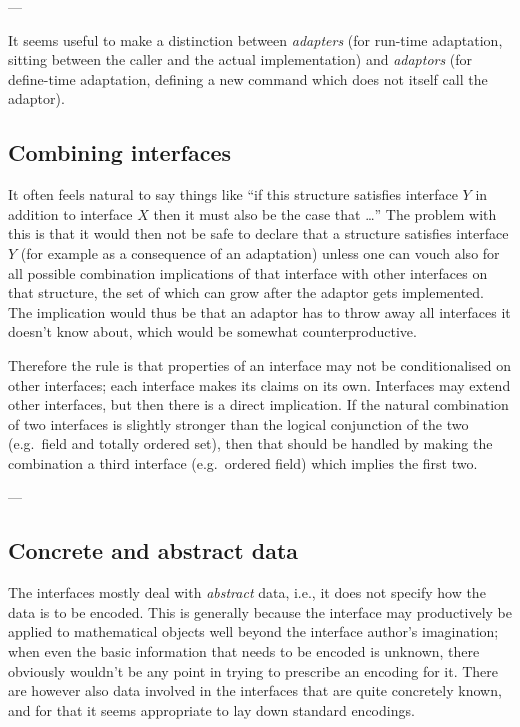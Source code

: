 \documentclass{mtmtcl}
\theoremstyle{plain}
\theoremstyle{remark}
\begin{document}
---

It seems useful to make a distinction between \emph{adapters} (for 
run-time adaptation, sitting between the caller and the actual 
implementation) and \emph{adaptors} (for define-time adaptation, 
defining a new command which does not itself call the adaptor).


\subsection{Combining interfaces}

It often feels natural to say things like ``if this structure 
satisfies interface $Y$ in addition to interface $X$ then it must 
also be the case that \dots'' The problem with this is that it would 
then not be safe to declare that a structure satisfies interface $Y$ 
(for example as a consequence of an adaptation) unless one can vouch 
also for all possible combination implications of that interface 
with other interfaces on that structure, the set of which can grow 
after the adaptor gets implemented. The implication would thus be 
that an adaptor has to throw away all interfaces it doesn't know 
about, which would be somewhat counterproductive.

Therefore the rule is that properties of an interface may not be 
conditionalised on other interfaces; each interface makes its claims 
on its own. Interfaces may extend other interfaces, but then there is 
a direct implication. If the natural combination of two interfaces is 
slightly stronger than the logical conjunction of the two (e.g.~field 
and totally ordered set), then that should be handled by making the 
combination a third interface (e.g.~ordered field) which implies the 
first two.


---


\subsection{Concrete and abstract data}

The interfaces mostly deal with \emph{abstract} data, i.e., it does 
not specify how the data is to be encoded. This is generally because 
the interface may productively be applied to mathematical objects 
well beyond the interface author's imagination; when even the 
basic information that needs to be encoded is unknown, there 
obviously wouldn't be any point in trying to prescribe an encoding 
for it. There are however also data involved in the interfaces that 
are quite concretely known, and for that it seems appropriate to lay 
down standard encodings.
\end{document}
